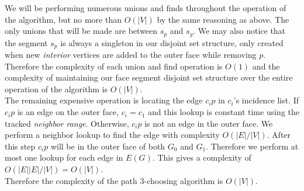 \documentclass[11pt,letter]{article}
\begin{document}
\noindent We will be performing numerous unions and finds throughout the operation of the algorithm, but no more
than $O(|V|)$ by the same reasoning as above. The only unions that will be made are between $s_p$ and
$s_y$. We may also notice that the segment $s_p$ is always a singleton in our disjoint set structure, only created
when new \emph{interior} vertices are added to the outer face while removing $p$. Therefore the complexity of
each union and find operation is $O(1)$ and the complexity of maintaining our face segment 
disjoint set structure over the entire operation of the algorithm is $O(|V|)$.\\

\noindent The remaining expensive operation
is locating the edge $c_ip$ in $c_i$'s incidence list. If $c_ip$ is an edge on the outer face, $c_i=c_1$ and
this lookup is constant time using the tracked \emph{neighbor range}. Otherwise, $c_ip$ is not an edge in
the outer face. We perform a neighbor lookup to find the edge with complexity $O(|E|/|V|)$.
After this step $c_ip$ will be in the outer face of both $G_0$ and $G_1$. Therefore we perform at most one lookup
for each edge in $E(G)$. This gives a complexity of $O(|E||E|/|V|)=O(|V|)$.\\

\noindent Therefore the complexity of the path $3$-choosing algorithm is $O(|V|)$.
\end{document}
